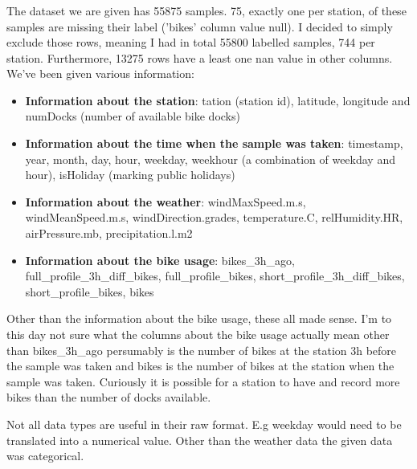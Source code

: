 \documentclass[a4paper]{article}
\begin{document}
    \subsubsection*{}
    The dataset we are given has 55875 samples. 75, exactly one per station, of these samples are missing their label ('bikes'
    column value null).
    I decided to simply exclude those rows, meaning I had in total 55800 labelled samples, 744 per station. Furthermore,
    13275 rows have a least one nan value in other columns.
    We've been given various information:
    \begin{itemize}
        \item \textbf{Information about the station}: tation (station id), latitude, longitude and
        numDocks (number of available bike docks)
        \item \textbf{Information about the time when the sample was taken}: timestamp, year, month, day, hour,
        weekday, weekhour (a combination of weekday and hour), isHoliday (marking public holidays)
        \item \textbf{Information about the weather}: windMaxSpeed.m.s, windMeanSpeed.m.s,  windDirection.grades,
        temperature.C, relHumidity.HR, airPressure.mb, precipitation.l.m2
        \item \textbf{Information about the bike usage}: bikes\_3h\_ago, full\_profile\_3h\_diff\_bikes,
        full\_profile\_bikes, short\_profile\_3h\_diff\_bikes, short\_profile\_bikes, bikes
    \end{itemize}

    Other than the information about the bike usage, these all made sense. I'm to this day not sure what the columns
    about the bike usage actually mean other than bikes\_3h\_ago persumably is the number of bikes at the station 3h
    before the sample was taken and bikes is the number of bikes at the station when the sample was taken. Curiously it
    is possible for a station to have and record more bikes than the number of docks available.

    Not all data types are useful in their raw format. E.g weekday would need to be translated into a numerical value.
    Other than the weather data the given data was categorical.

    \subsubsection*{}
\end{document}

